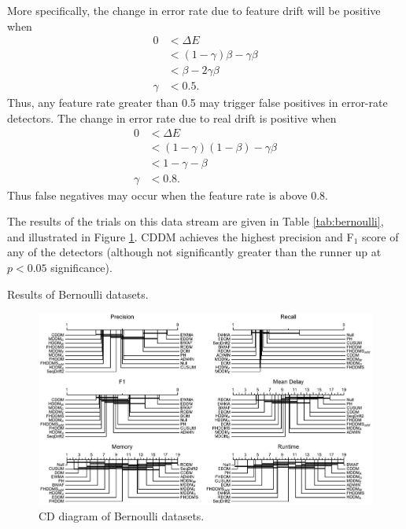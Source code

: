 More specifically, the change in error rate due to feature drift will be positive when
\begin{align}
  0 &< \Delta E \\
  &< (1-\gamma)\beta - \gamma \beta \\
  &< \beta-2\gamma\beta \\
  \gamma &< 0.5.
\end{align}
Thus, any feature rate greater than 0.5 may trigger false positives in error-rate detectors. The change in error rate due to real drift is positive when
\begin{align}
  0 &< \Delta E \\
  &< (1-\gamma)(1-\beta) - \gamma\beta \\
  &< 1 - \gamma - \beta \\
  \gamma &< 0.8.
\end{align}
Thus false negatives may occur when the feature rate is above 0.8.

The results of the trials on this data stream are given in Table \ref{tab:bernoulli}, and illustrated in Figure \ref{fig:bernoulli_cd}. CDDM achieves the highest precision and F$_1$ score of any of the detectors (although not significantly greater than the runner up at $p<0.05$ significance). 

\begin{table}
    \centering
    \caption{Results of Bernoulli datasets.}
    
    \label{tab:bernoulli}
\end{table}

\begin{figure}
    \centering
    \includegraphics[width=\textwidth]{images/cd_diagrams/bernoulli.pdf}
    \caption{CD diagram of Bernoulli datasets.}
    \label{fig:bernoulli_cd}
\end{figure}

